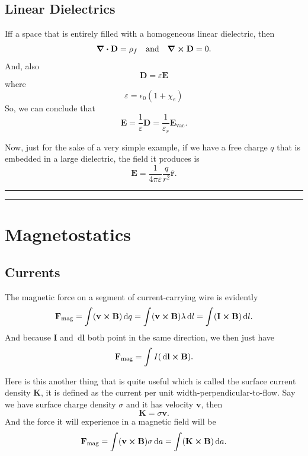 \documentclass[12pt,english]{article}
\newcommand{\dmr}[1]{\, \mathrm{d}#1} %
\numberwithin{equation}{subsection}
\let\oldhat\hat
\renewcommand{\vec}[1]{\mathbf{#1}}
\renewcommand{\hat}[1]{\oldhat{\mathbf{#1}}}
\begin{document}
\subsection{Linear Dielectrics}
Iff a space that is entirely filled with a homogeneous linear dielectric, then  
\begin{align*}
    \div \vec{D} = \rho_f &&\text{and}&& \curl \vec{D} =0.
\end{align*}
And, also
\[
    \vec{D} = \varepsilon \vec{E}
\]
where
\begin{equation}
    \varepsilon = \epsilon_0(1+\chi_e)
\end{equation}
So, we can conclude that
\begin{equation}
    \vec{E} = \frac{1}{\varepsilon} \vec{D} = \frac{1}{\varepsilon_r}\vec{E}_{\text{vac}}.
\end{equation}

Now, just for the sake of a very simple example, if we have a free charge $q$ that is embedded in a large dielectric, the field it produces is 
\begin{equation}
    \vec{E} = \frac{1}{4 \pi \varepsilon} \frac{q}{r^2} \hat{r}.
\end{equation}

\par\noindent\rule{\textwidth}{0.4pt}
\par\noindent\rule{\textwidth}{0.4pt}
\section{Magnetostatics}
\subsection{Currents}
The magnetic force on a segment of current-carrying wire is evidently 
\begin{equation}
    \vec{F}_{\text{mag}} = \int (\vec{v}\cross\vec{B}) \dmr{q} = \int (\vec{v}\cross\vec{B})\lambda\dmr{l} = \int(\vec{I}\cross\vec{B})\dmr{l}.
\end{equation}
And because $\vec{I}$ and $\dmr{\vec{l}}$ both point in the same direction, we then just have
\begin{equation}
    \vec{F}_{\text{mag}} =\int I(\dmr{\vec{l}}\cross \vec{B}).
\end{equation}

Here is this another thing that is quite useful which is called the surface current density $\vec{K}$, it is defined as the current per unit width-perpendicular-to-flow. Say we have surface charge density $\sigma$ and it has velocity $\vec{v}$, then
\begin{equation}
    \vec{K} = \sigma \vec{v}.
\end{equation}
And the force it will experience in a magnetic field will be
\begin{equation}
    \vec{F}_{\text{mag}}=\int (\vec{v} \cross \vec{B})\sigma \dmr{a} = \int (\vec{K}\cross \vec{B})\dmr{a}.
\end{equation}
\end{document}
